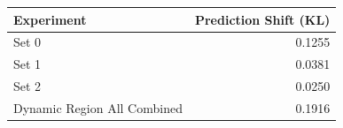 \begin{tabular}{lr}
\toprule
Experiment & Prediction Shift (KL) \\
\midrule
Set 0 & 0.1255 \\
Set 1 & 0.0381 \\
Set 2 & 0.0250 \\
Dynamic Region All Combined & 0.1916 \\
\bottomrule
\end{tabular}
